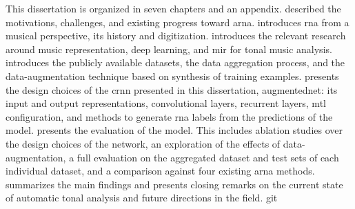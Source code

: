 
This dissertation is organized in seven chapters and an
appendix.  described the motivations,
challenges, and existing progress toward \gls{arna}.
 introduces
\gls{rna} from a musical perspective, its history and
digitization.  introduces the relevant
research around music representation, deep learning, and
\gls{mir} for tonal music analysis.
 introduces the
publicly available datasets, the data aggregation process,
and the data-augmentation technique based on synthesis of
training examples.  presents the design
choices of the \gls{crnn} presented in this dissertation,
\gls{augmentednet}: its input and output representations,
convolutional layers, recurrent layers, \gls{mtl}
configuration, and methods to generate \gls{rna} labels from
the predictions of the model.
 presents the evaluation of
the model. This includes ablation studies over the design
choices of the network, an exploration of the effects of
data-augmentation, a full evaluation on the aggregated
dataset and test sets of each individual dataset, and a
comparison against four existing \gls{arna} methods.
 summarizes the main findings and
presents closing remarks on the current state of automatic
tonal analysis and future directions in the field. git 

